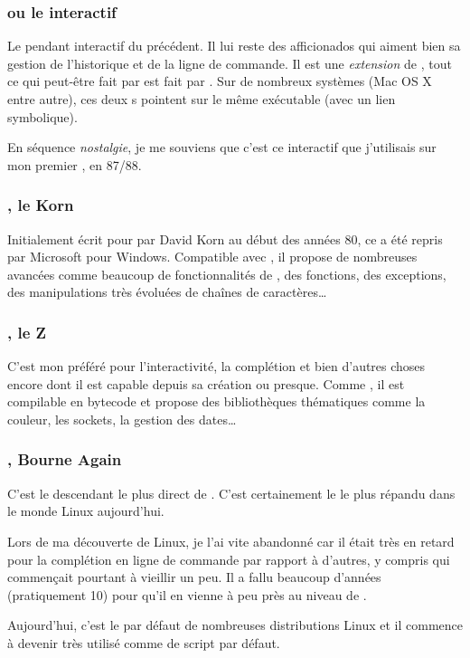 \subsubsection{\tcsh{} ou le \csh{} interactif}
Le pendant interactif du précédent. Il lui reste des afficionados qui aiment bien sa gestion de l'historique et de la ligne de commande.  Il est une \emph{extension} de \csh{}, \ie tout ce qui peut-être fait par \csh{} est fait par \tcsh{}. Sur de nombreux systèmes (Mac OS X  entre autre), ces deux \shell{}s pointent sur le même exécutable (avec un lien symbolique).

En séquence \emph{nostalgie}, je me souviens que c'est ce \shell{} interactif que j'utilisais sur mon premier \unix{}, en 87/88.

\subsubsection{\ksh{}, le Korn  \shell{}}
Initialement écrit pour \unix{} par David Korn au début des années 80, ce \shell{} a été repris par Microsoft pour Windows. Compatible avec \sh{}, il propose de nombreuses avancées comme beaucoup de fonctionnalités de \tcsh{},  des fonctions, des exceptions, des manipulations très évoluées de chaînes de caractères\ldots

\subsubsection{\zsh{}, le Z  \shell{}}
C'est mon préféré pour l'interactivité, la complétion et bien d'autres choses encore dont il est capable depuis sa création ou presque. Comme \ksh{}, il est compilable en bytecode et propose des bibliothèques thématiques comme la couleur, les sockets, la gestion des dates\ldots

\subsubsection{\bash{}, Bourne Again  \shell{}}
C'est le descendant le plus direct de \sh{}. C'est certainement le \shell{} le plus répandu dans le monde Linux aujourd'hui. 

Lors de ma découverte de Linux, je l'ai vite abandonné car il était très en retard pour la complétion en ligne de commande par rapport à d'autres, y compris \tcsh{} qui commençait pourtant à vieillir un peu. Il a fallu beaucoup d'années (pratiquement 10) pour qu'il en vienne à peu près au niveau de \zsh{}.

Aujourd'hui, c'est le \shell{} par défaut de nombreuses distributions Linux et il commence à devenir très utilisé comme \shell{} de script par défaut. 

